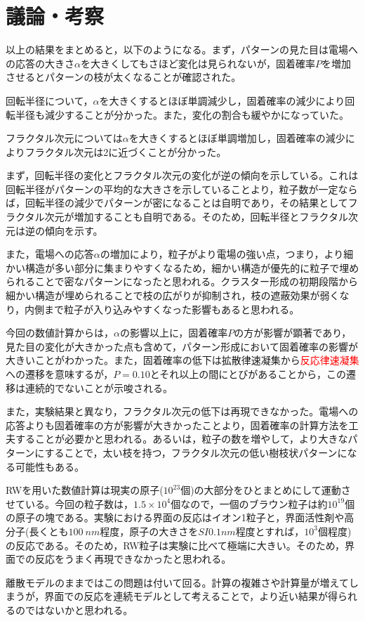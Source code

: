 \documentclass[autodetect-engine,dvi=dvipdfmx,a4paper,ja=standard,oneside,openany,11pt,draft]{bxjsbook}
\begin{document}
\section{議論・考察}
以上の結果をまとめると，以下のようになる。まず，パターンの見た目は電場への応答の大きさ$\alpha$を大きくしてもさほど変化は見られないが，固着確率$P$を増加させるとパターンの枝が太くなることが確認された。

回転半径について，$\alpha$を大きくするとほぼ単調減少し，固着確率の減少により回転半径も減少することが分かった。また，変化の割合も緩やかになっていた。

フラクタル次元については$\alpha$を大きくするとほぼ単調増加し，固着確率の減少によりフラクタル次元は2に近づくことが分かった。

まず，回転半径の変化とフラクタル次元の変化が逆の傾向を示している。これは回転半径がパターンの平均的な大きさを示していることより，粒子数が一定ならば，回転半径の減少でパターンが密になることは自明であり，その結果としてフラクタル次元が増加することも自明である。そのため，回転半径とフラクタル次元は逆の傾向を示す。

また，電場への応答$\alpha$の増加により，粒子がより電場の強い点，つまり，より細かい構造が多い部分に集まりやすくなるため，細かい構造が優先的に粒子で埋められることで密なパターンになったと思われる。クラスター形成の初期段階から細かい構造が埋められることで枝の広がりが抑制され，枝の遮蔽効果が弱くなり，内側まで粒子が入り込みやすくなった影響もあると思われる。

今回の数値計算からは，$\alpha$の影響以上に，固着確率$P$の方が影響が顕著であり，見た目の変化が大きかった点も含めて，パターン形成において固着確率の影響が大きいことがわかった。また，固着確率の低下は拡散律速凝集から\textcolor{red}{反応律速凝集}への遷移を意味するが，$P=0.10$とそれ以上の間にとびがあることから，この遷移は連続的でないことが示唆される。

また，実験結果と異なり，フラクタル次元の低下は再現できなかった。電場への応答よりも固着確率の方が影響が大きかったことより，固着確率の計算方法を工夫することが必要かと思われる。あるいは，粒子の数を増やして，より大きなパターンにすることで，太い枝を持つ，フラクタル次元の低い樹枝状パターンになる可能性もある。

RWを用いた数値計算は現実の原子($10^{23}$個)の大部分をひとまとめにして運動させている。今回の粒子数は，$1.5\times10^4$個なので，一個のブラウン粒子は約$10^{19}$個の原子の塊である。実験における界面の反応はイオン1粒子と，界面活性剤や高分子(長くとも$\SI{100}{nm}$程度，原子の大きさを$SI{0.1}{nm}$程度とすれば，$10^3$個程度)の反応である。そのため，RW粒子は実験に比べて極端に大きい。そのため，界面での反応をうまく再現できなかったと思われる。

離散モデルのままではこの問題は付いて回る。計算の複雑さや計算量が増えてしまうが，界面での反応を連続モデルとして考えることで，より近い結果が得られるのではないかと思われる。

\ifdraft{
  
  
}{}
\end{document}
